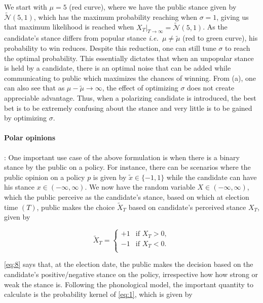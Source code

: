 \documentclass[aps,prl,twocolumn,showpacs,final]{revtex4-1}
\newcommand{\ie}{\textit{i.e.\ }}
\newcommand\at[2]{\left.#1\right|_{#2}}
\begin{document}
We start with $\mu=5$ (red curve), where we have the public stance given by $\tilde{\mathcal{N}}(5,1)$, which has the maximum probability reaching when $\sigma=1$, giving us that maximum likelihood is reached when  $\at{X_T}{T\rightarrow\infty}=\tilde{\mathcal{N}}(5,1)$. As the candidate's stance differs from popular stance \ie $\mu\neq\tilde{\mu}$ (red to green curve), his probability to win reduces. Despite this reduction, one can still tune $\sigma$ to reach the optimal probability. This essentially dictates that when an unpopular stance is held by a candidate, there is an optimal noise that can be added while communicating to public which maximizes the chances of winning. From (a), one can also see that as $\mu-\tilde{\mu}\rightarrow\infty$, the effect of optimizing $\sigma$ does not create appreciable advantage. Thus, when a polarizing candidate is introduced, the best bet is to be extremely confusing about the stance and very little is to be gained by optimizing $\sigma$. 

\paragraph*{Polar opinions}: One important use case of the above formulation is when there is a binary stance by the public on a policy. For instance, there can be scenarios where the public opinion on a policy $p$ is given by $\tilde{x} \in \{-1,1\}$ while the candidate can have his stance $x \in (-\infty,\infty)$. We now have the random variable $X\in (-\infty,\infty)$, which the public perceive as the candidate's stance, based on which at election time $(T)$, public makes the choice $\tilde{X}_T$ based on candidate's perceived stance $X_T$, given by


\begin{equation}
    \tilde{X}_T = \begin{cases}
              +1 & \text{if } X_T> 0,\\
              -1 & \text{if } X_T< 0.\\
          \end{cases}\label{eq:8}
\end{equation}

\autoref{eq:8} says that, at the election date, the public makes the decision based on the candidate's  positive/negative stance on the policy, irrespective how how strong or weak the stance is. Following the phonological model, the important quantity to calculate is the probability kernel of \eqref{eq:1}, which is given by 
\end{document}
